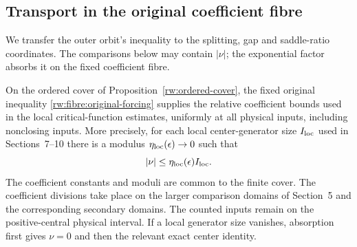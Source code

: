 \subsection{Transport in the original coefficient fibre}

We transfer the outer orbit's inequality to the splitting, gap and
saddle-ratio coordinates. The comparisons below may contain $|\nu|$;
the exponential factor absorbs it on the fixed coefficient fibre.

\begin{proposition}
\label{rw:coefficient-transport}
On the ordered cover of Proposition~\ref{rw:ordered-cover},
the fixed original inequality
\eqref{rw:fibre:original-forcing} supplies the relative coefficient
bounds used in the local critical-function estimates, uniformly at
all physical inputs, including
nonclosing inputs. More precisely, for each local center-generator
size $I_{\rm loc}$ used in Sections~7--10 there is a modulus
$\eta_{\rm loc}(\epsilon)\to0$ such that
\[
 |\nu|\le\eta_{\rm loc}(\epsilon)I_{\rm loc}.
\]
The coefficient constants and moduli are common to the finite cover.
The coefficient divisions take place on the larger comparison
domains of Section~5 and the corresponding secondary domains.
The counted inputs remain on the positive-central physical interval.
If a local generator size vanishes, absorption first gives
$\nu=0$ and then the relevant exact center identity.
\end{proposition}
